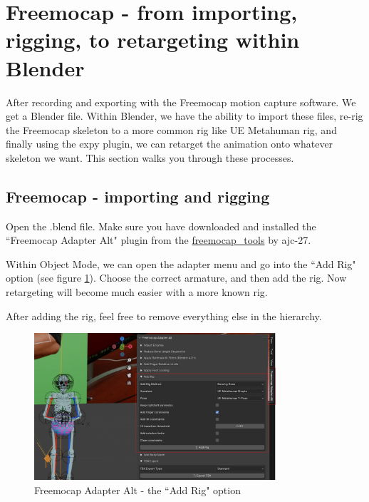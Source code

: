\documentclass{uva-inf-article}
\begin{document}
\section{Freemocap - from importing, rigging, to retargeting within Blender}
After recording and exporting with the Freemocap motion capture software. We get a Blender file. Within Blender, we have the ability to import these files, re-rig the Freemocap skeleton to a more common rig like UE Metahuman rig, and finally using the expy plugin, we can retarget the animation onto whatever skeleton we want. This section walks you through these processes.

\subsection{Freemocap - importing and rigging}
Open the .blend file. Make sure you have downloaded and installed the ``Freemocap Adapter Alt" plugin from the \href{https://github.com/ajc27-git/freemocap_tools}{freemocap\_tools} by ajc-27.

Within Object Mode, we can open the adapter menu and go into the ``Add Rig" option (see figure \ref{fig:rigifyfreemocap}). Choose the correct armature, and then add the rig. Now retargeting will become much easier with a more known rig.

After adding the rig, feel free to remove everything else in the hierarchy.
\begin{figure}[hbt!]
    \centering
    \includegraphics[width=0.8\textwidth]{imgs/rigify.png}
    \caption{Freemocap Adapter Alt - the ``Add Rig" option}
    \label{fig:rigifyfreemocap}
\end{figure}
\end{document}
